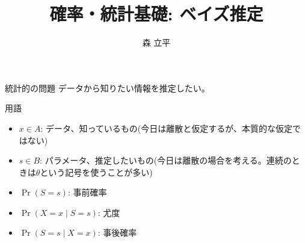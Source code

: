 \documentclass[lualatex,handout]{beamer}
\title{確率・統計基礎: ベイズ推定}
\author{森 立平}
\date{}
\theoremstyle{definition}
\begin{document}
\begin{frame}[plain]
\maketitle
\end{frame}


\begin{frame}{統計的の問題}
データから知りたい情報を推定したい。



\end{frame}
\fi

\begin{frame}{用語}
\begin{itemize}
\setlength{\itemsep}{2em}
\item $x\in A$: データ、知っているもの(今日は離散と仮定するが、本質的な仮定ではない)
\item $s\in B$: パラメータ、推定したいもの(今日は離散の場合を考える。連続のときは$\theta$という記号を使うことが多い)
\item $\Pr(S = s)$: 事前確率
\item $\Pr(X = x \mid S = s)$: 尤度
\item $\Pr(S = s \mid X = x)$: 事後確率
\end{itemize}
\end{frame}
\end{document}
